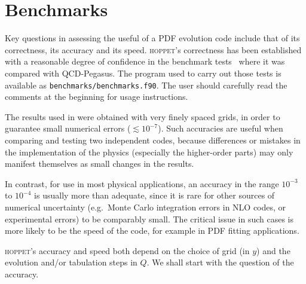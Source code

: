 \documentclass[12pt]{article}
\newcommand{\eg}{e.g.\ }
\newcommand{\hoppet}{\textsc{hoppet}\xspace}
\newcommand{\ttt}[1]{\texttt{#1}}
\begin{document}
\section{Benchmarks}
\label{sec:benchmarks}

Key questions in assessing the useful of a PDF evolution code include
that of its correctness, its accuracy and its speed. \hoppet's
correctness has been established with a reasonable degree of
confidence in the benchmark tests~\cite{Benchmarks} where it was
compared with QCD-Pegasus. The program used to carry out those tests
is available as \ttt{benchmarks/benchmarks.f90}. The user should
carefully read the comments at the beginning for usage instructions.

The results used in \cite{Benchmarks} were obtained with very finely
spaced grids, in order to guarantee small numerical errors ($\lesssim
10^{-7}$).  Such accuracies are useful when comparing and testing two
independent codes, because differences or mistakes in the
implementation of the physics (especially the higher-order parts) may
only manifest themselves as small changes in the results.

In contrast, for use in most physical applications, an accuracy in the
range $10^{-3}$ to $10^{-4}$ is usually more than adequate, since it
is rare for other sources of numerical uncertainty (\eg Monte Carlo
integration errors in NLO codes, or experimental errors) to be
comparably small. The critical issue in such cases is more likely to
be the speed of the code, for example in PDF fitting
applications.

\hoppet's accuracy and speed both depend on the choice of grid (in
$y$) and the evolution and/or tabulation steps in $Q$. We shall start
with the question of the accuracy.


\end{document}
